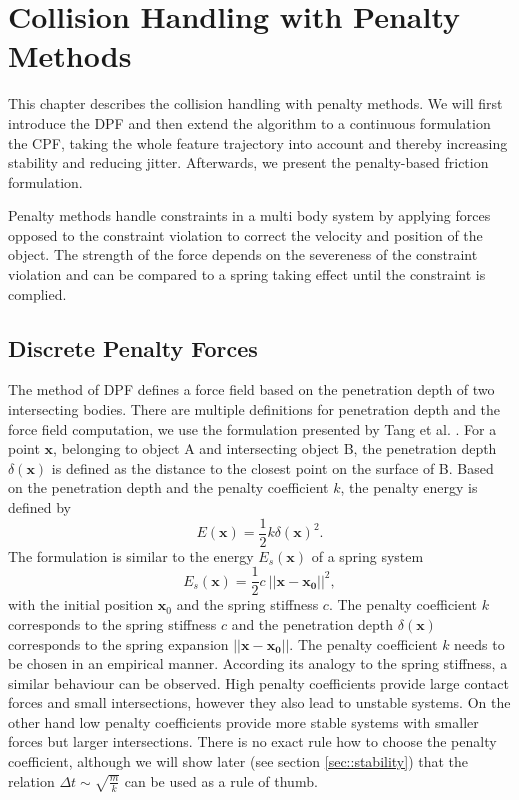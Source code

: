 \chapter{Collision Handling with Penalty Methods}
\label{ch:DiscretePenaltyForces}
This chapter describes the collision handling with penalty methods.
We will first introduce the DPF and then extend the algorithm to a continuous formulation the CPF, taking the whole feature trajectory into account and thereby increasing stability and reducing jitter.
Afterwards, we present the penalty-based friction formulation.

Penalty methods handle constraints in a multi body system by applying forces opposed to the constraint violation to correct the velocity and position of the object. The strength of the force depends on the severeness of the constraint violation \cite{BENDER2007} and can be compared to a spring taking effect until the constraint is complied.

\section{Discrete Penalty Forces}
\label{sec:DiscretePF}
 The method of DPF defines a force field based on the penetration depth of two intersecting bodies. There are multiple definitions for penetration depth and the force field computation, we use the formulation presented by Tang et al. \cite{TANG2012}. For a point $\mathbf{x}$, belonging to object A and intersecting object B, the penetration depth $\delta(\mathbf{x})$ is defined as the distance to the closest point on the surface of B. Based on the penetration depth and the penalty coefficient $k$, the penalty energy is defined by
\begin{equation}
      E(\mathbf{x}) = \frac{1}{2}k \delta (\mathbf{x})^2 .
      \label{eq:penalty_energy}
\end{equation}
The formulation is similar to the energy $E_s(\mathbf x)$ of a spring system \cite{GROSS2011} %
\begin{equation}
      E_{s}(\mathbf{x}) = \frac{1}{2} c ~||\mathbf{x-x_0}|| ^2,
\end{equation}
with the initial position $\mathbf x_0$ and the spring stiffness $c$.
The penalty coefficient $k$ corresponds to the spring stiffness $c$ and the penetration depth $\delta(\mathbf{x})$ corresponds to the spring expansion $||\mathbf{x-x_0}||$.
The penalty coefficient $k$ needs to be chosen in an empirical manner. According  its analogy to the spring stiffness, a similar behaviour can be observed. High penalty coefficients provide large contact forces and small intersections, however they also lead to unstable systems. On the other hand low penalty coefficients provide more stable systems with smaller forces but larger intersections. There is no exact rule how to choose the penalty coefficient, although we will show later (see section \ref{sec::stability}) that the relation $\Delta t \sim \sqrt{\frac{m}{k}}$ can be used as a rule of thumb.

